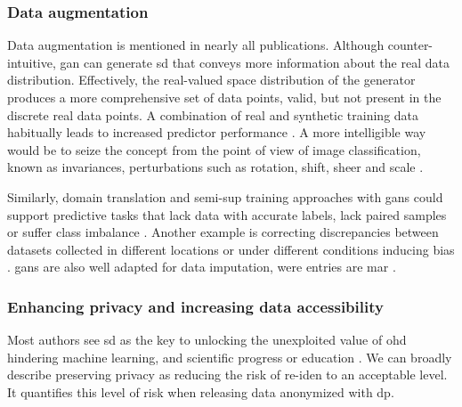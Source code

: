         \subsubsection{Data augmentation}\label{sec:augmentation}
    
            Data augmentation  is mentioned in nearly all publications. Although counter-intuitive, \gls{gan} can generate \gls{sd} that conveys more information about the real data distribution. Effectively, the real-valued space distribution of the generator produces a more comprehensive set of data points, valid, but not present in the discrete real data points. A combination of real and synthetic training data habitually leads to increased predictor performance \cite{Wang_2019,Che_2017,Yoon2018-ite, yoon2018imputation, Yang_2019_impute_ehr, Chen_2019, cui2019conan, Che_2017}. A more intelligible way would be to seize the concept from the point of view of image classification, known as invariances, perturbations such as rotation, shift, sheer and scale \cite{antoniou2017data}.\par 
            
            Similarly, domain translation  and \gls{semi-sup} training approaches with \glspl{gan} could support predictive tasks that lack data with accurate labels, lack paired samples or suffer class imbalance \cite{Che_2017,mcdermott2018semi, Yoon2018-ite}. Another example is correcting discrepancies between datasets collected in different locations or under different conditions inducing bias \cite{Yoon2018-radial}. \glspl{gan} are also well adapted for data imputation, were  entries are \gls{mar} \cite{yoon2018imputation}. 

        \subsubsection{Enhancing privacy and increasing data accessibility}\label{sec:access_privacy}
    
            Most authors see \gls{sd} as the key to unlocking the unexploited value of \gls{ohd} hindering machine learning, and scientific progress \cite{Beaulieu-Jones2019-ct, baowaly_2019_IEEE,baowaly_2019_jamia,Che_2017,esteban2017real,Fisher2019,severo2019ward2icu} or education \cite{laderas_teaching_2018}. We can broadly describe preserving privacy as reducing the risk of \gls{re-iden} to an acceptable level. It quantifies this level of risk when releasing data anonymized with \gls{dp}.\par {}
    
